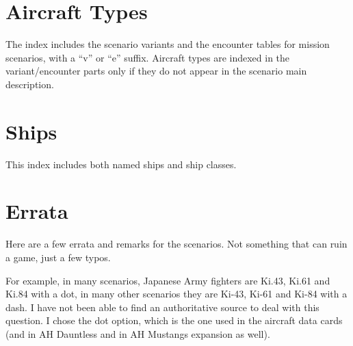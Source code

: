 \documentclass[a4paper,twocolumn]{article}
\begin{document}
\section*{Aircraft Types}

The index includes the scenario variants and the encounter
tables for mission scenarios, with a ``v'' or ``e''
suffix. Aircraft types are indexed in the variant/encounter parts only if they do not appear in the
scenario main description.

\vspace{2mm}

\begin{hangparas}{4mm}{1}
\end{hangparas}

\section*{Ships}

This index includes both named ships and ship classes.

\vspace{2mm}

\begin{hangparas}{4mm}{1}
\end{hangparas}

\section*{Errata}

Here are a few errata and remarks for the scenarios. Not something that can ruin a game, just
a few typos.

For example, in many scenarios, Japanese Army fighters are Ki.43, Ki.61 and Ki.84
with a dot, in many other scenarios they are Ki-43, Ki-61 and Ki-84 with a
dash. I have not been able to find an authoritative source to
deal with this question. I chose the dot option, which is the one
used in the aircraft data cards (and in AH Dauntless and in AH Mustangs expansion
as well).

\vspace{3mm}

\begin{hangparas}{4mm}{1}
\end{hangparas}
\end{document}
